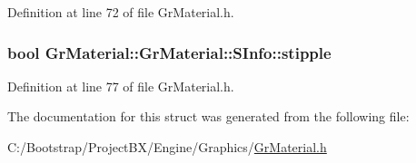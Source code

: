 Definition at line 72 of file GrMaterial.h.\hypertarget{struct_gr_material_1_1_s_info_67a1d89836a0e6033e8e65a4a13b6e67}{
\subsubsection[{stipple}]{\setlength{\rightskip}{0pt plus 5cm}bool GrMaterial::GrMaterial::SInfo::stipple}}
\label{struct_gr_material_1_1_s_info_67a1d89836a0e6033e8e65a4a13b6e67}




Definition at line 77 of file GrMaterial.h.

The documentation for this struct was generated from the following file:\begin{CompactItemize}
\item 
C:/Bootstrap/ProjectBX/Engine/Graphics/\hyperlink{_gr_material_8h}{GrMaterial.h}\end{CompactItemize}
